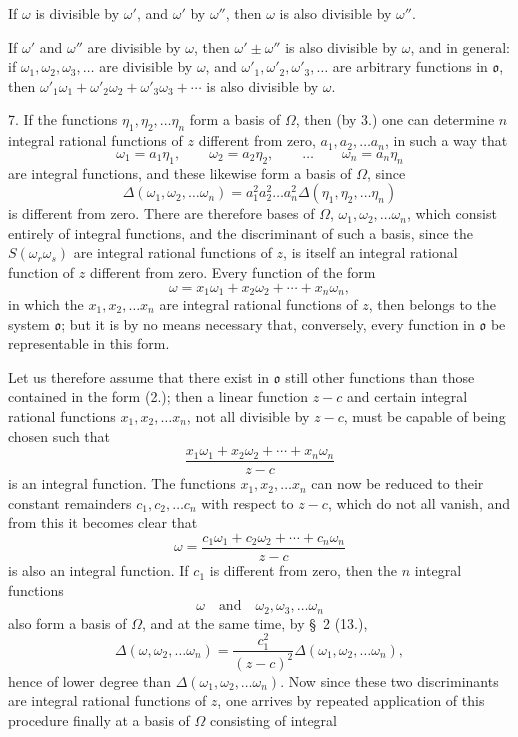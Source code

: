 \documentclass{article}
\begin{document}
If $\omega$ is divisible by $\omega'$, and $\omega'$ by $\omega''$, then $\omega$ is also divisible by $\omega''$.

If $\omega'$ and $\omega''$ are divisible by $\omega$, then $\omega' \pm \omega''$ is also divisible by $\omega$, and in general: if $\omega_{1}, \omega_{2}, \omega_{3}, \ldots$ are divisible by $\omega$, and $\omega'_{1}, \omega'_{2}, \omega'_{3}, \ldots$ are arbitrary functions in $\mathfrak{o}$, then $\omega'_{1}\omega_{1} + \omega'_{2}\omega_{2} + \omega'_{3}\omega_{3} + \cdots$ is also divisible by $\omega$.


7. If the functions $\eta_{1}, \eta_{2}, \ldots \eta_{n}$ form a basis of $\Omega$, then (by 3.) one can determine $n$ integral rational functions of $z$ different from zero, $a_{1}, a_{2}, \ldots a_{n}$, in such a way that
\[ \omega_{1} = a_{1}\eta_{1}, \qquad \omega_{2} = a_{2}\eta_{2}, \qquad \ldots \qquad \omega_{n} = a_{n}\eta_{n} \]
are integral functions, and these likewise form a basis of $\Omega$, since
\[ \Delta(\omega_{1}, \omega_{2}, \ldots \omega_{n}) = a_{1}^{2}a_{2}^{2}\ldots a_{n}^{2}\Delta(\eta_{1}, \eta_{2}, \ldots \eta_{n}) \]
is different from zero. There are therefore bases of $\Omega$, $\omega_{1}, \omega_{2}, \ldots \omega_{n}$, which consist entirely of integral functions, and the discriminant of such a basis, since the $S(\omega_{r}\omega_{s})$ are integral rational functions of $z$, is itself an integral rational function of $z$ different from zero. Every function of the form
\[ \omega = x_{1}\omega_{1} + x_{2}\omega_{2} + \cdots + x_{n}\omega_{n}, \tag{2.} \]
in which the $x_{1}, x_{2}, \ldots x_{n}$ are integral rational functions of $z$, then belongs to the system $\mathfrak{o}$; but it is by no means necessary that, conversely, every function in $\mathfrak{o}$ be representable in this form.

Let us therefore assume that there exist in $\mathfrak{o}$ still other functions than those contained in the form (2.); then a linear function $z-c$ and certain integral rational functions $x_{1}, x_{2}, \ldots x_{n}$, not all divisible by $z-c$, must be capable of being chosen such that
\[ \frac{x_{1}\omega_{1} + x_{2}\omega_{2} + \cdots + x_{n}\omega_{n}}{z-c} \]
is an integral function. The functions $x_{1}, x_{2}, \ldots x_{n}$ can now be reduced to their constant remainders $c_{1}, c_{2}, \ldots c_{n}$ with respect to $z-c$, which do not all vanish, and from this it becomes clear that
\[ \omega = \frac{c_{1}\omega_{1} + c_{2}\omega_{2} + \cdots + c_{n}\omega_{n}}{z-c} \]
is also an integral function. If $c_{1}$ is different from zero, then the $n$ integral functions
\[ \omega \quad \text{and} \quad \omega_{2}, \omega_{3}, \ldots \omega_{n} \]
also form a basis of $\Omega$, and at the same time, by §~2 (13.),
\[ \Delta(\omega, \omega_{2}, \ldots \omega_{n}) = \frac{c_{1}^{2}}{(z-c)^{2}}\Delta(\omega_{1}, \omega_{2}, \ldots \omega_{n}), \]
hence of lower degree than $\Delta(\omega_{1}, \omega_{2}, \ldots \omega_{n})$. Now since these two discriminants are integral rational functions of $z$, one arrives by repeated application of this procedure finally at a basis of $\Omega$ consisting of integral
\end{document}
